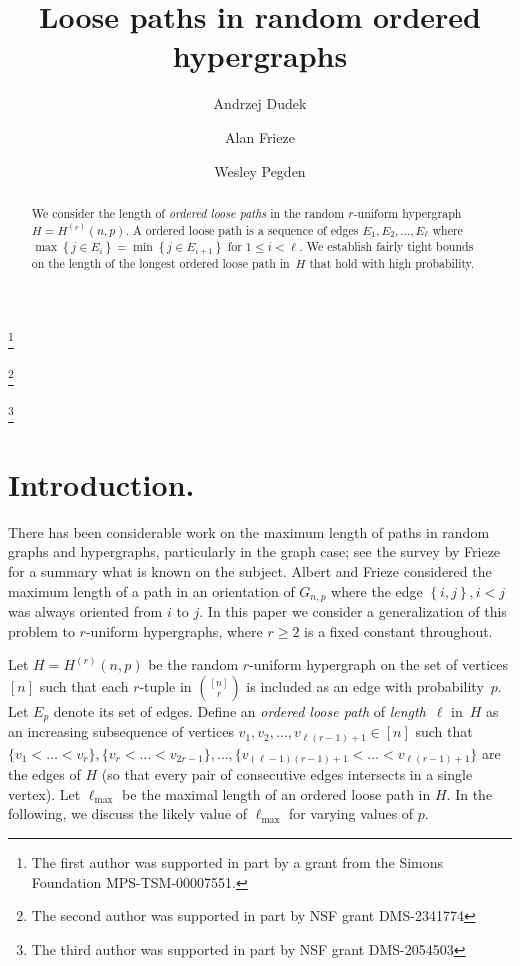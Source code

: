 \documentclass[12pt,reqno]{amsart}
\theoremstyle{remark}
\newcommand{\set}[1]{\left\{#1\right\}}
\begin{document}
\title{Loose paths in random ordered hypergraphs}

\author{Andrzej Dudek}
\address{Department of Mathematics, Western Michigan University, Kalamazoo, MI}
\thanks{The first author was supported in part by a grant from the Simons Foundation MPS-TSM-00007551.}

\author{Alan Frieze}
\address{Department of Mathematical Sciences, Carnegie Mellon University, Pittsburgh, PA}
\thanks{The second author was supported in part by NSF grant DMS-2341774}

\author{Wesley Pegden}
\address{Department of Mathematical Sciences, Carnegie Mellon University, Pittsburgh, PA}
\thanks{The third author was supported in part by NSF grant DMS-2054503}


\begin{abstract}
We consider the length of {\em ordered loose paths} in the random $r$-uniform hypergraph $H=H^{(r)}(n, p)$. A ordered loose path is a sequence of edges $E_1,E_2,\ldots,E_\ell$ where $\max\set{j\in E_i}=\min\set{j\in E_{i+1}}$ for $1\leq i<\ell$. We establish fairly tight bounds on the length of the longest ordered loose path in~$H$ that hold with high probability.
\end{abstract}

\maketitle

\section{Introduction.}
There has been considerable work on the maximum length of paths in random graphs and hypergraphs, particularly in the graph case; see the survey by Frieze \cite{Survey} for a summary what is known on the subject. Albert and Frieze \cite{AF} considered the maximum length of a path in an orientation of $G_{n,p}$ where the edge $\set{i,j},i<j$ was always oriented from $i$ to $j$. In this paper we consider a generalization of this problem to $r$-uniform hypergraphs, where $r \geq 2$ is a fixed constant throughout.

Let $H=H^{(r)}(n, p)$ be the random $r$-uniform hypergraph on the set of vertices $[n]$ such that each $r$-tuple in $\binom{[n]}{r}$ is included as an edge with probability~$p$. Let $E_p$ denote its set of edges. Define an \emph{ordered loose path} of \emph{length}~$\ell$ in~$H$ as an increasing subsequence of vertices $v_1,v_2,\dots,v_{\ell (r-1)+1}\in [n]$ such that $\{v_1<\dots<v_r\}, \{v_r<\dots<v_{2r-1}\},\dots,\{v_{(\ell-1)(r-1)+1}<\dots<v_{\ell (r-1)+1}\}$ are the edges of $H$ (so that every pair of consecutive edges intersects in a single vertex). Let $\ell_{\max}$ be the maximal length of an ordered loose path in $H$. In the following, we discuss the likely value of $\ell_{\max}$ for varying values of $p$.
\end{document}
